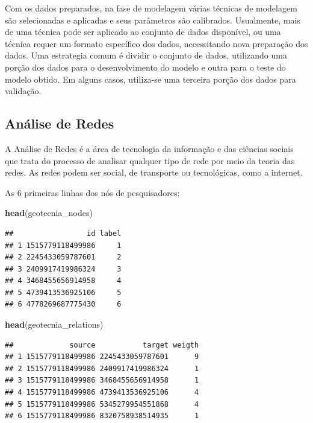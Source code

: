 \documentclass[]{article}
\newenvironment{Shaded}{\begin{snugshade}}{\end{snugshade}}
\newcommand{\KeywordTok}[1]{\textcolor[rgb]{0.13,0.29,0.53}{\textbf{#1}}}
\newcommand{\NormalTok}[1]{#1}
\begin{document}
Com os dados preparados, na fase de modelagem várias técnicas de
modelagem são selecionadas e aplicadas e seus parâmetros são calibrados.
Usualmente, mais de uma técnica pode ser aplicado ao conjunto de dados
disponível, ou uma técnica requer um formato específico dos dados,
necessitando nova preparação dos dados. Uma estrategia comum é dividir o
conjunto de dados, utilizando uma porção dos dados para o
desenvolvimento do modelo e outra para o teste do modelo obtido. Em
alguns casos, utiliza-se uma terceira porção dos dados para validação.

\hypertarget{anuxe1lise-de-redes}{%
\subsection{Análise de Redes}\label{anuxe1lise-de-redes}}

A Análise de Redes é a área de tecnologia da informação e das ciências
sociais que trata do processo de analisar qualquer tipo de rede por meio
da teoria das redes. As redes podem ser social, de transporte ou
tecnológicas, como a internet.

As 6 primeiras linhas dos nós de pesquisadores:

\begin{Shaded}
\begin{Highlighting}[]
\KeywordTok{head}\NormalTok{(geotecnia_nodes)}
\end{Highlighting}
\end{Shaded}

\begin{verbatim}
##                 id label
## 1 1515779118499986     1
## 2 2245433059787601     2
## 3 2409917419986324     3
## 4 3468455656914958     4
## 5 4739413536925106     5
## 6 4778269687775430     6
\end{verbatim}

\begin{Shaded}
\begin{Highlighting}[]
\KeywordTok{head}\NormalTok{(geotecnia_relations)}
\end{Highlighting}
\end{Shaded}

\begin{verbatim}
##             source           target weigth
## 1 1515779118499986 2245433059787601      9
## 2 1515779118499986 2409917419986324      1
## 3 1515779118499986 3468455656914958      1
## 4 1515779118499986 4739413536925106      4
## 5 1515779118499986 5345279954551868      4
## 6 1515779118499986 8320758938514935      1
\end{verbatim}
\end{document}
